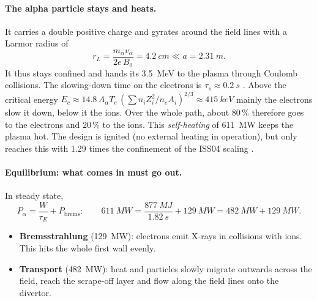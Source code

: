 \paragraph{The alpha particle stays and heats.} It carries a double positive charge and gyrates around the field lines
with a Larmor radius of
\[ r_L = \frac{m_\alpha v_\alpha}{2e\,B_0} = \SI{4.2}{cm} \ll a = \SI{2.31}{m}. \]
It thus stays confined and hands its \SI{3.5}{MeV} to the plasma through Coulomb collisions. The slowing-down time on
the electrons is $\tau_s \approx \SI{0.2}{s}$ \cite{stix1972}. Above the critical energy
$E_c \approx 14.8\,A_\alpha T_e\,(\sum n_i Z_i^2/n_e A_i)^{2/3} \approx \SI{415}{keV}$ mainly the electrons slow it
down, below it the ions. Over the whole path, about 80\,\% therefore goes to the electrons and 20\,\% to the ions. This
\emph{self-heating} of \SI{611}{MW} keeps the plasma hot. The design is ignited (no external heating in operation), but
only reaches this with 1.29 times the confinement of the ISS04 scaling \cite{yamada2005}.

\paragraph{Equilibrium: what comes in must go out.} In steady state,
\[ P_\alpha = \frac{W}{\tau_E} + P_\mathrm{brems}:\qquad
   \SI{611}{MW} = \frac{\SI{877}{MJ}}{\SI{1.82}{s}} + \SI{129}{MW} = \SI{482}{MW} + \SI{129}{MW}. \]
\begin{itemize}
\item \textbf{Bremsstrahlung} (\SI{129}{MW}): electrons emit X-rays in collisions with ions. This hits the whole first
  wall evenly.
\item \textbf{Transport} (\SI{482}{MW}): heat and particles slowly migrate outwards across the field, reach the
  scrape-off layer and flow along the field lines onto the divertor.
\end{itemize}



